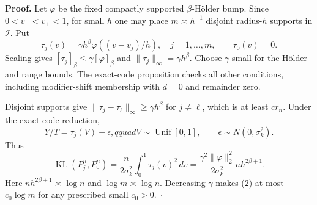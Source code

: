 \textbf{Proof.}
Let \(\varphi\) be the fixed compactly supported \(\beta\)-H\"older bump.  Since \(0<v_-<v_+<1\), for small \(h\) one may place \(m\asymp h^{-1}\) disjoint radius-\(h\) supports in \(\mathcal I\).  Put
\[
 \tau_j(v)=\gamma h^\beta\varphi((v-v_j)/h),\quad j=1,\ldots,m,
 \qquad \tau_0(v)=0. \tag{1}
\]
Scaling gives \([\tau_j]_\beta\le\gamma[\varphi]_\beta\) and \(\|\tau_j\|_\infty=\gamma h^\beta\).  Choose \(\gamma\) small for the H\"older and range bounds.  The exact-code proposition checks all other conditions, including modifier-shift membership with \(d=0\) and remainder zero.

Disjoint supports give \(\|\tau_j-\tau_\ell\|_\infty\ge\gamma h^\beta\) for \(j\ne\ell\), which is at least \(cr_n\).  Under the exact-code reduction,
\[
 Y/T=\tau_j(V)+\epsilon,qquad V\sim\operatorname{Unif}[0,1],
 \qquad \epsilon\sim N(0,\sigma_k^2).
\]
Thus
\[
 \operatorname{KL}(P_j^n,P_0^n)
 =\frac{n}{2\sigma_k^2}\int_0^1\tau_j(v)^2\,dv
 =\frac{\gamma^2\|\varphi\|_2^2}{2\sigma_k^2}nh^{2\beta+1}. \tag{2}
\]
Here \(nh^{2\beta+1}\asymp\log n\) and \(\log m\asymp\log n\).  Decreasing \(\gamma\) makes (2) at most \(c_0\log m\) for any prescribed small \(c_0>0\). \(\square\)